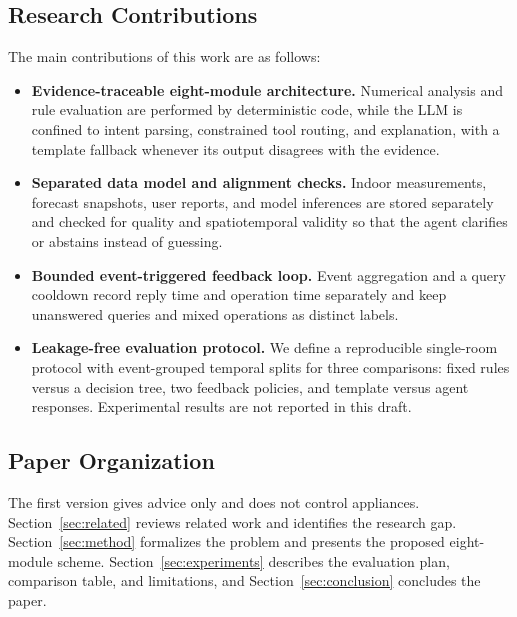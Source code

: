 \subsection{Research Contributions}
The main contributions of this work are as follows:
\begin{itemize}
\item \textbf{Evidence-traceable eight-module architecture.} Numerical analysis and rule evaluation are performed by deterministic code, while the LLM is confined to intent parsing, constrained tool routing, and explanation, with a template fallback whenever its output disagrees with the evidence.
\item \textbf{Separated data model and alignment checks.} Indoor measurements, forecast snapshots, user reports, and model inferences are stored separately and checked for quality and spatiotemporal validity so that the agent clarifies or abstains instead of guessing.
\item \textbf{Bounded event-triggered feedback loop.} Event aggregation and a query cooldown record reply time and operation time separately and keep unanswered queries and mixed operations as distinct labels.
\item \textbf{Leakage-free evaluation protocol.} We define a reproducible single-room protocol with event-grouped temporal splits for three comparisons: fixed rules versus a decision tree, two feedback policies, and template versus agent responses. Experimental results are not reported in this draft.
\end{itemize}

\subsection{Paper Organization}
The first version gives advice only and does not control appliances. Section~\ref{sec:related} reviews related work and identifies the research gap. Section~\ref{sec:method} formalizes the problem and presents the proposed eight-module scheme. Section~\ref{sec:experiments} describes the evaluation plan, comparison table, and limitations, and Section~\ref{sec:conclusion} concludes the paper.
